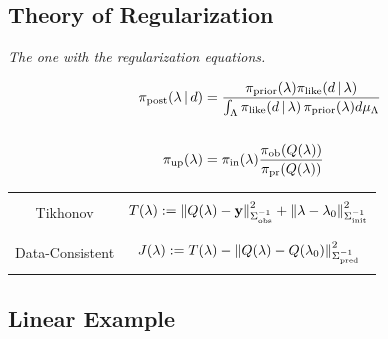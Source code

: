 \subsection{Theory of Regularization}

\begin{frame}{\it The one with the regularization equations.}

\begin{table}[htbp]
\centering
\begin{equation*}
\begin{split}
\operatorname*{\pi_{post}}(\lambda\,|\,d) &= \frac{\operatorname*{\pi_{prior}}(\lambda)\pi_\text{like}(d\,|\,\lambda)}{\int_{{\Lambda}} \pi_\text{like}(d\, |\, \lambda)  \operatorname*{\pi_{prior}}(\lambda) d\mu_{{\Lambda}}} \\
& \\
\operatorname*{\pi_{up}}(\lambda) &= \operatorname*{\pi_{in}}(\lambda) \frac{\operatorname*{\pi_{ob}}(Q(\lambda))}{\operatorname*{\pi_{pr}}(Q(\lambda))}
\end{split}
\end{equation*}

\bigskip
\begin{tabular}{|c|c|}
\hline
& \\
  Tikhonov & $T(\lambda):=\left\Vert Q(\lambda)-\mathbf{y}\right\Vert_{\Sigma_\text{obs}^{-1}}^2 +
      \left\Vert\lambda-\lambda_0\right\Vert_{\Sigma_\text{init}^{-1}}^2$ \\
& \\
\hline & \\
  Data-Consistent & $J(\lambda):=T(\lambda) - \left\Vert Q(\lambda)-Q(\lambda_0)\right\Vert_{\Sigma_\text{pred}^{-1}}^2$ \\
& \\
  \hline
\end{tabular}
%
%
  \label{tab:func_comparisons}
\end{table}


\end{frame}



\subsection{Linear Example}

